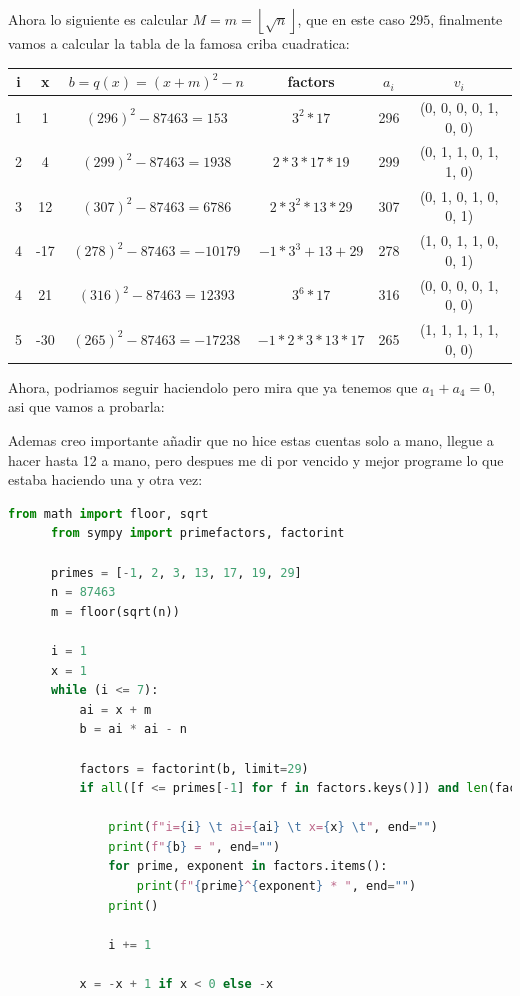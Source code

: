 \documentclass[12pt, fleqn]{report}                             %
\theoremstyle{break}                                            %
\newcommand{\Floor}[1]      {\left \lfloor #1 \right \rfloor}   %
\begin{document}
    Ahora lo siguiente es calcular $M = m = \Floor{\sqrt{n}}$, que en este caso $295$, finalmente
    vamos a calcular la tabla de la famosa criba cuadratica:

    \begin{tabular}{|c |c |c | c |c | c| }
      \hline
      i & x & $b = q(x) = (x+m)^2 - n$ & factors & $a_i$ & $v_i$ \\ [0.5ex] 
      \hline\hline
     
      1 & 1   & $(296)^2  - 87463 = 153$ & $3^2 * 17$                 & 296 & (0, 0, 0, 0, 1, 0, 0)    \\
      2 & 4   & $(299)^2  - 87463 = 1938$ & $2 * 3 * 17 * 19$         & 299 & (0, 1, 1, 0, 1, 1, 0)    \\
      3 & 12  & $(307)^2  - 87463 = 6786$ & $2 * 3^2 * 13 * 29$       & 307 & (0, 1, 0, 1, 0, 0, 1)    \\
      4 & -17 & $(278)^2  - 87463 = -10179$ & $-1 * 3^3 + 13 + 29$    & 278 & (1, 0, 1, 1, 0, 0, 1)    \\
      4 &  21 & $(316)^2  - 87463 = 12393$ & $3^6 * 17$               & 316 & (0, 0, 0, 0, 1, 0, 0)    \\
      5 & -30 & $(265)^2  - 87463 = -17238$ & $-1 * 2 * 3 * 13 * 17$  & 265 & (1, 1, 1, 1, 1, 0, 0)    \\
      \hline
    \end{tabular}

    Ahora, podriamos seguir haciendolo pero mira que ya tenemos que $a_1 + a_4 = 0$, asi que vamos a probarla:

    Ademas creo importante añadir que no hice estas cuentas solo a mano, llegue a hacer hasta 12 a mano, pero despues
    me di por vencido y mejor programe lo que estaba haciendo una y otra vez:
    \begin{lstlisting}[language=Python, gobble=6]
      from math import floor, sqrt
      from sympy import primefactors, factorint

      primes = [-1, 2, 3, 13, 17, 19, 29]
      n = 87463
      m = floor(sqrt(n))

      i = 1
      x = 1
      while (i <= 7):
          ai = x + m
          b = ai * ai - n

          factors = factorint(b, limit=29)
          if all([f <= primes[-1] for f in factors.keys()]) and len(factors) > 1:

              print(f"i={i} \t ai={ai} \t x={x} \t", end="")
              print(f"{b} = ", end="")
              for prime, exponent in factors.items():
                  print(f"{prime}^{exponent} * ", end="")
              print()

              i += 1

          x = -x + 1 if x < 0 else -x
      \end{lstlisting}
\end{document}
